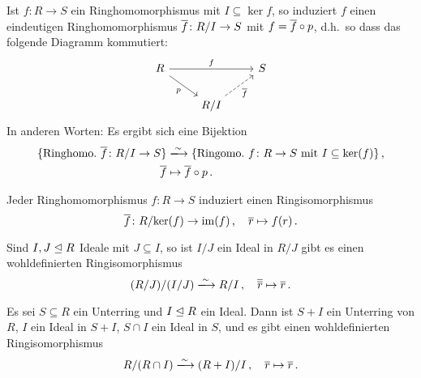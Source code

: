 \begin{theorem}[Homomorphiesatz]
  Ist $f \colon R \to S$ ein Ringhomomorphismus mit $I \subseteq \ker f$, so induziert $f$ einen eindeutigen Ringhomomorphismus $\overline{f} \colon R/I \to S$ mit $f = \overline{f} \circ p$, d.h.\ so dass das folgende Diagramm kommutiert:
  \[
    \begin{tikzcd}
        R
        \arrow{rr}[above]{f}
        \arrow{dr}[below left]{p}
      & {}
      & S
      \\
        {}
      & R/I
        \arrow[dashed]{ru}[below right]{\induced{f}}
      & {}
    \end{tikzcd}
  \]
  In anderen Worten:
  Es ergibt sich eine Bijektion
  \begin{align*}
                            \{ \text{Ringhomo.\ $\induced{f} \colon R/I \to S$} \}
    &\xlongrightarrow{\sim} \{ \text{Ringomo.\ $f \colon R \to S$ mit $I \subseteq \ker(f)$} \} \,,  \\
                            \induced{f}
    &\mapsto                \induced{f} \circ p \,.
  \end{align*}
\end{theorem}

\begin{corollary}[1.\ Isomorphiesatz]
  Jeder Ringhomomorphismus $f \colon R \to S$ induziert einen Ringisomorphismus
  \[
            \overline{f}
    \colon  R/{\ker(f)}
    \to     \operatorname{im}(f) \,,
    \quad   \overline{r}
    \mapsto f(r) \,.
  \]
\end{corollary}

\begin{corollary}[2.\ Isomorphiesatz]
  Sind $I, J \mathrel{\trianglelefteq} R$ Ideale mit $J \subseteq I$, so ist $I/J$ ein Ideal in $R/J$ gibt es einen wohldefinierten Ringisomorphismus
  \[
                            (R/J)/(I/J)
    \xlongrightarrow{\sim}  R/I \,,
    \quad                   \class{\class{r}}
    \mapsto                 \class{r} \,.
  \]

\end{corollary}

\begin{corollary}[3.\ Isomorphiesatz]
  Es sei $S \subseteq R$ ein Unterring und $I \mathrel{\trianglelefteq} R$ ein Ideal.
  Dann ist $S + I$ ein Unterring von $R$, $I$ ein Ideal in $S + I$, $S \cap I$ ein Ideal in $S$, und es gibt einen wohldefinierten Ringisomorphismus
  \[
                            R/(R \cap I)
    \xlongrightarrow{\sim}  (R + I)/I \,,
    \quad                   \class{r}
    \mapsto                 \class{r} \,.
  \]
\end{corollary}

